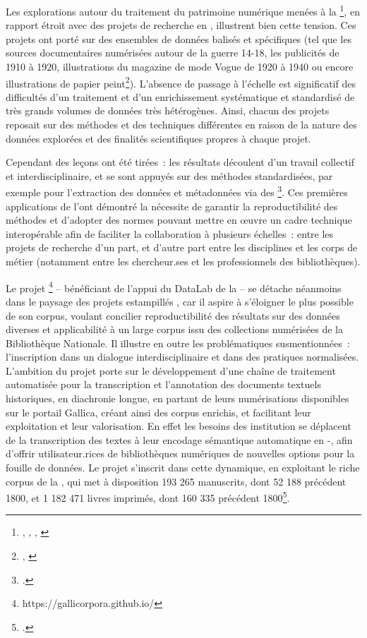 Les explorations autour du traitement du patrimoine numérique menées à
la \bnf\footnote{\cite{bermes_patrimoine_2020}, \cite{beaudouin_cartographie_2017}, \cite{michez_gallicapix_2021}, \cite{bouchard_presentation_2017}},
en rapport étroit avec des projets de recherche en \hn, illustrent bien
cette tension. Ces projets ont porté sur des ensembles de données
balisés et spécifiques (tel que les sources documentaires numérisées
autour de la guerre 14-18, les publicités de 1910 à 1920, illustrations
du magazine de mode Vogue de 1920 à 1940 ou encore illustrations de
papier peint\footnote{\cite{beaudouin_cartographie_2017}, \cite{michez_gallicapix_2021}}). L'absence de
passage à l'échelle est significatif des difficultés d'un traitement et
d'un enrichissement systématique et standardisé de très grands volumes de données très
hétérogènes. Ainsi, chacun des projets reposait sur des méthodes et des
techniques différentes en raison de la nature des données explorées et
des finalités scientifiques propres à chaque projet.

Cependant des leçons ont été tirées~: les résultats découlent d'un
travail collectif et interdisciplinaire, et se sont appuyés sur des
méthodes standardisées, par exemple pour l'extraction des données et
métadonnées via des \apis\footcite[p.7]{bermes_patrimoine_2020}. Ces
premières applications de l'\ia ont démontré la nécessite de garantir la
reproductibilité des méthodes et d'adopter des normes pouvant mettre en
œuvre un cadre technique interopérable afin de faciliter la
collaboration à plusieurs échelles~: entre les projets de recherche d'un
part, et d'autre part entre les disciplines et les corps de métier
(notamment entre les chercheur.ses et les professionnels des
bibliothèques).

Le projet \gaga\footnote{https://gallicorpora.github.io/} --
bénéficiant de l'appui du DataLab de la \bnf -- se détache néanmoins dans
le paysage des projets estampillés \bnf, car il aspire à s'éloigner le
plus possible de son corpus, voulant concilier reproductibilité des
résultats sur des données diverses et applicabilité à un large corpus
issu des collections numérisées de la Bibliothèque Nationale. Il
illustre en outre les problématiques susmentionnées~: l'inscription dans
un dialogue interdisciplinaire et dans des pratiques normalisées.
L'ambition du projet porte sur le développement d'une chaîne de
traitement automatisée pour la transcription et l'annotation des documents textuels historiques, en diachronie longue, en
partant de leurs numérisations disponibles sur le portail Gallica,
créant ainsi des corpus enrichis, et facilitant leur exploitation et
leur valorisation. En effet les besoins des institution se déplacent de la transcription des textes à leur encodage sémantique automatique en \xml-\tei, afin d'offrir
utilisateur.rices de bibliothèques numériques de nouvelles options pour la
fouille de données. Le projet \gaga s'inscrit dans cette
dynamique, en exploitant le riche corpus de la \bnf, qui met à disposition 193 265
manuscrits, dont 52 188 précédent 1800, et 1 182 471 livres imprimés,
dont 160 335 précédent 1800\footcite{sagot_gallicorpor_2022}.


